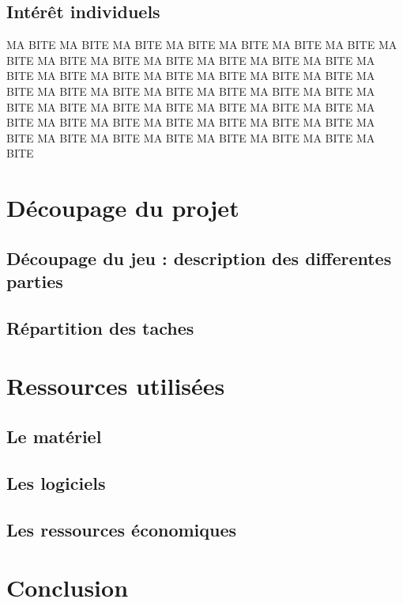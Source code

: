 \documentclass[12pt,a4paper]{article}
\begin{document}
\subsection{Intérêt individuels}
MA BITE MA BITE MA BITE MA BITE MA BITE MA BITE MA BITE MA BITE MA BITE MA BITE 
MA BITE MA BITE MA BITE MA BITE MA BITE MA BITE MA BITE MA BITE MA BITE MA BITE 
MA BITE MA BITE MA BITE MA BITE MA BITE MA BITE MA BITE MA BITE MA BITE MA BITE 
MA BITE MA BITE MA BITE MA BITE MA BITE MA BITE MA BITE MA BITE MA BITE MA BITE 
MA BITE MA BITE MA BITE MA BITE MA BITE MA BITE MA BITE MA BITE MA BITE MA BITE 

\newpage
\section{Découpage du projet}
\subsection{Découpage du jeu : description des differentes parties}
\subsection{Répartition des taches}

\newpage
\section{Ressources utilisées}
\subsection{Le matériel}
\subsection{Les logiciels}
\subsection{Les ressources économiques}

\newpage
\section{Conclusion}	
\end{document}
